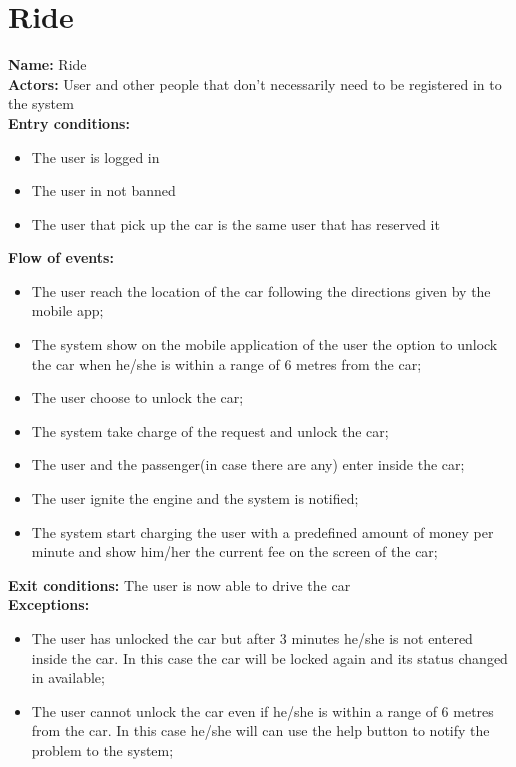\section*{Ride}
\textbf{Name:} Ride\\
\textbf{Actors:} User and other people that don't necessarily need to be registered in to the system\\
\textbf{Entry conditions:}
\begin{itemize}
\item The user is logged in
\item The user in not banned
\item The user that pick up the car is the same user that has reserved it
\end{itemize}
\textbf{Flow of events:}
\begin{itemize}
\item The user reach the location of the car following the directions given by the mobile app;
\item The system show on the mobile application of the user the option to unlock the car when he/she is within a range of 6 metres from the car;
\item The user choose to unlock the car;
\item The system take charge of the request and unlock the car;
\item The user and the passenger(in case there are any) enter inside the car;
\item The user ignite the engine and the system is notified;
\item The system start charging the user with a predefined amount of money per minute and show him/her the current fee on the screen of the car;
\end{itemize}
\textbf{Exit conditions:} The user is now able to drive the car \\
\textbf{Exceptions:}
\begin{itemize}
\item The user has unlocked the car but after 3 minutes he/she is not entered inside the car. In this case  the car will be locked again and its status changed in available;
\item The user cannot unlock the car even if he/she is within a range of 6 metres from the car. In this case he/she will can use the help button  to notify the problem to the system;
\end{itemize}



